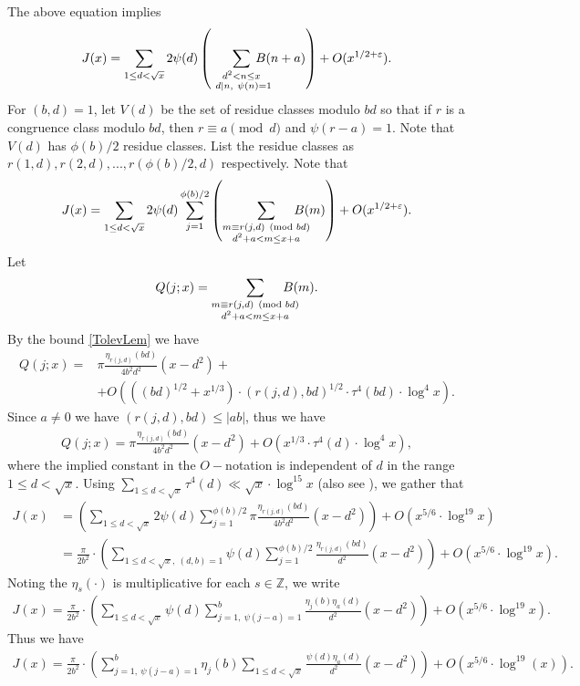 \documentclass[12pt]{amsart}
\newcommand{\1}{\mathmybb{1}}
\begin{document}
The above equation implies 
\begin{align*}
J(x) = \sum_{1 \leq d < \sqrt{x}}2\psi(d)\left(\sum_{\substack{d^2 < n \leq x \\ \ d|n, \ \psi(n) = 1}}\hspace{-0.5cm}B(n+a)\right) + O(x^{1/2 + \varepsilon}).
\end{align*}
For $(b,d) = 1$, let $V(d)$ be the set of residue classes modulo $bd$ so that if $r$ is a congruence class modulo $bd$, then $r \equiv a \pmod d$ and $\psi(r-a) = 1$. Note that $V(d)$ has $\phi(b)/2$ residue classes. List the residue classes as $r(1,d), r(2,d),...,r(\phi(b)/2,d)$ respectively. Note that
\begin{align*}
J(x) = \sum_{1 \leq d < \sqrt{x}}2\psi(d) \sum_{j=1}^{\phi(b)/2} \left(\sum_{\substack{m \equiv r(j,d)  \pmod{bd}\\ d^2+a<m \leq x+a}}\hspace{-0.5cm} B(m)\right) + O(x^{1/2 + \varepsilon}).
\end{align*}
Let 
\begin{align*}
Q(j;x) = \sum_{\substack{m \equiv r(j,d)  \pmod{bd} \\ d^2+a<m \leq x+a}} \hspace{-0.5cm}B(m).
\end{align*}
By the bound \eqref{TolevLem} we have
\begin{align*}
Q(j;x) =&\pi \frac{\eta_{r(j,d)}(bd)}{4b^2 d^2}(x-d^2) +\\
&+O\left(\left((bd)^{1/2} + x^{1/3}\right)\cdot(r(j,d),bd)^{1/2}\cdot\tau^{4}(bd)\cdot\log^{4}x\right).
\end{align*}
Since $a \neq 0$ we have $(r(j,d),bd) \leq |ab|$,  thus we have
\begin{align*}
Q(j;x) = \pi \frac{\eta_{r(j,d)}(bd)}{4b^2 d^2}(x-d^2) + O(x^{1/3}\cdot\tau^4(d)\cdot\log^4x),
\end{align*}
where the implied constant in the $O-$notation is independent of $d$ in the range $1 \leq d < \sqrt{x}$. Using $\sum_{1\leq d < \sqrt{x}}\tau^4(d) \ll \sqrt{x}\cdot\log^{15}x$ \cite{Wilson} (also see \cite{Luca}), we gather that
\begin{align*}
J(x) &= \left(\sum_{1 \leq d < \sqrt{x}}2\psi(d)\sum_{j=1}^{\phi(b)/2}\pi \frac{\eta_{r(j,d)}(bd)}{4b^2 d^2}(x-d^2)\right) + O(x^{5/6}\cdot\log^{19}x)\\
&= \frac{\pi}{2 b^2}\cdot\left(\sum_{1 \leq d < \sqrt{x}, \ (d,b)=1}\psi(d)\sum_{j=1}^{\phi(b)/2} \frac{\eta_{r(j,d)}(bd)}{d^2}(x-d^2)\right) + O(x^{5/6}\cdot\log^{19}x).
\end{align*}
Noting the $\eta_{s}(\cdot)$ is multiplicative for each $s \in \mathbb{Z}$, we write
\begin{align*}
J(x) =\frac{\pi}{2 b^2}\cdot\left(\sum_{1 \leq d < \sqrt{x}}\psi(d)\sum_{j=1, \ \psi(j-a) = 1}^{b} \frac{\eta_{j}(b)\eta_{a}(d)}{d^2}(x-d^2)\right) + O(x^{5/6}\cdot\log^{19}x).
\end{align*}
Thus we have
\begin{align}
\label{Jbaequation}
J(x) = \frac{\pi}{2b^2}\cdot\left(\sum_{j=1, \ \psi(j-a) = 1}^{b}\eta_{j}(b)\sum_{1 \leq d < \sqrt{x}}\frac{\psi(d)\eta_{a}(d)}{d^2}(x-d^2)\right) + O(x^{5/6}\cdot\log^{19}(x)).
\end{align}
\end{document}
